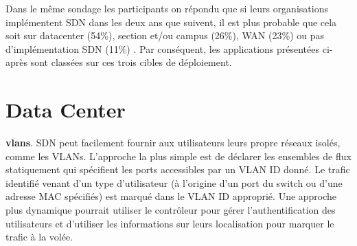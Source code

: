 Dans le même sondage les participants on répondu que si leurs organisations implémentent SDN dans les deux ans que suivent, il est plus probable que cela soit sur \gls{datacenter} (54\%), section et/ou campus (26\%), WAN (23\%) ou pas d'implémentation SDN (11\%) \cite{2013GuideSDNNVTable12}. Par conséquent, les applications présentées ci-après sont classées sur ces trois cibles de déploiement.




\section{Data Center}

\textbf{\glspl{vlan}}. SDN peut facilement fournir aux utilisateurs leurs propre réseaux isolés, comme les VLANs. L'approche la plus simple est de déclarer les ensembles de flux statiquement qui spécifient les ports accessibles par un VLAN ID donné. Le trafic identifié venant d'un type d'utilisateur (à l'origine d'un port du switch ou d'une adresse MAC spécifiés) est marqué dans le VLAN ID approprié. Une approche plus dynamique pourrait utiliser le contrôleur pour gérer l'authentification des utilisateurs et d'utiliser les informations sur leurs localisation pour marquer le trafic à la volée. \cite{OpenFlowStanfordUsing} 







